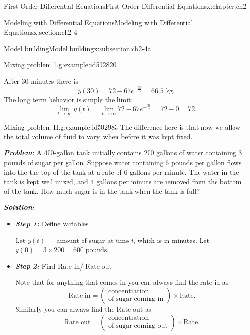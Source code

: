\documentclass[oneside,10pt,]{book}
\newcommand{\alert}[1]{\textbf{\textit{#1}}}
\numberwithin{equation}{section}
\numberwithin{equation}{section}
\begin{document}
\begin{chapterptx}{First Order Differential Equations}{}{First Order Differential Equations}{}{}{x:chapter:ch2}
\begin{sectionptx}{Modeling with Differential Equations}{}{Modeling with Differential Equations}{}{}{x:section:ch2-4}
\begin{subsectionptx}{Model building}{}{Model building}{}{}{x:subsection:ch2-4a}
\begin{example}{Mixing problem 1.}{g:example:id502820}
\begin{itemize}[label=\textbullet]
\par
After 30 minutes there is%
\begin{equation*}
y(30)=72-67e^{-\frac{30}{12}}=66.5\mbox{ kg}.
\end{equation*}
The long term behavior is simply the limit:%
\begin{equation*}
\lim_{t\to\infty}y(t)=\lim_{t\to\infty}72-67e^{-\frac{30}{12}}=72-0=72.
\end{equation*}
%
\end{itemize}
\end{example}
\begin{example}{Mixing problem II.}{g:example:id502983}%
The difference here is that now we allow the total volume of fluid to vary, when before it was kept fixed.%
\par
\alert{Problem:} A \(400\)-gallon tank initially contains \(200\) gallons of water containing \(3\) pounds of sugar per gallon. Suppose water containing \(5\) pounds per gallon flows into the the top of the tank at a rate of \(6\) gallons per minute. The water in the tank is kept well mixed, and \(4\) gallons per minute are removed from the bottom of the tank. How much sugar is in the tank when the tank is full?%
\par
\alert{Solution:}%
%
\begin{itemize}[label=\textbullet]
\item{}\alert{Step 1:} Define variables%
\par
Let \(y(t)=\) amount of sugar at time \(t\), which is in minutes. Let \(y(0)=3\times200=600\mbox{ pounds}\).%
\item{}\alert{Step 2:} Find Rate in\slash{} Rate out%
\par
Note that for anything that comes in you can always find the rate in as%
\begin{equation*}
\mbox{Rate in}=\left(\begin{array}{c}
\mbox{concentration}\\
\mbox{of sugar coming in}
\end{array}\right)\times\mbox{Rate}.
\end{equation*}
Similarly you can always find the Rate out as%
\begin{equation*}
\mbox{Rate out}=\left(\begin{array}{c}
\mbox{concentration}\\
\mbox{of sugar coming out}
\end{array}\right)\times\mbox{Rate}.
\end{equation*}
%
\par

\end{itemize}
\end{example}
\end{subsectionptx}
\end{sectionptx}
\end{chapterptx}
\end{document}
